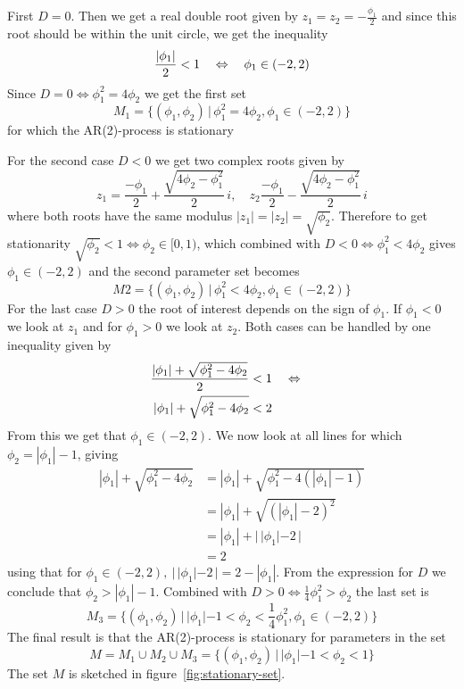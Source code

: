 First $D=0$. Then we get a real double root given by $z_1=z_2=-\frac{\phi_1}{2}$ and since this root should be within the unit circle, we get the inequality
\begin{equation*}
    \frac{|\phi_1|}{2} < 1 \quad\Leftrightarrow\quad \phi_1\in(-2, 2)
\end{equation*}
Since $D=0\Leftrightarrow\phi_1^2=4\phi_2$ we get the first set
\begin{equation*}
    M_1 = \{(\phi_1, \phi_2) \,|\, \phi_1^2=4\phi_2, \phi_1\in(-2,2)\}
\end{equation*}
for which the AR(2)-process is stationary \par
    For the second case $D<0$ we get two complex roots given by
\begin{equation*}
    z_1 = \frac{-\phi_1}{2} + \frac{\sqrt{4\phi_2 - \phi_1^2}}{2}\,i,\quad z_2\frac{-\phi_1}{2} - \frac{\sqrt{4\phi_2 - \phi_1^2}}{2}\,i
\end{equation*}
where both roots have the same modulus $|z_1|=|z_2|=\sqrt{\phi_2}$. Therefore to get stationarity $\sqrt{\phi_2}<1\Leftrightarrow\phi_2\in[0,1)$, which combined with $D<0 \Leftrightarrow \phi_1^2<4\phi_2$ gives $\phi_1\in(-2,2)$ and the second parameter set becomes
\begin{equation*}
    M2 = \{(\phi_1, \phi_2) \,|\, \phi_1^2<4\phi_2, \phi_1\in(-2,2)\}
\end{equation*}
For the last case $D>0$ the root of interest depends on the sign of $\phi_1$. If $\phi_1<0$ we look at $z_1$ and for $\phi_1>0$ we look at $z_2$. Both cases can be handled by one inequality given by
\begin{align*}
    \frac{|\phi_1| + \sqrt{\phi_1^2 - 4\phi_2}}{2} &< 1 \quad\Leftrightarrow\quad\\
    |\phi_1| + \sqrt{\phi_1^2 - 4\phi_2} &< 2
\end{align*}
From this we get that $\phi_1\in(-2,2)$. We now look at all lines for which $\phi_2=|\phi_1|-1$, giving
\begin{align*}
    |\phi_1| + \sqrt{\phi_1^2 - 4\phi_2} &= |\phi_1| + \sqrt{\phi_1^2 - 4(|\phi_1|-1)} \\
    &= |\phi_1| + \sqrt{(|\phi_1|-2)^2} \\
    &= |\phi_1| + |\,|\phi_1|-2\,| \\
    &= 2
\end{align*}
using that for $\phi_1\in(-2,2),\:|\,|\phi_1|-2\,|=2-|\phi_1|$. From the expression for $D$ we conclude that $\phi_2>|\phi_1|-1$. Combined with $D>0\Leftrightarrow \frac{1}{4}\phi_1^2>\phi_2$ the last set is
\begin{equation*}
    M_3 = \{(\phi_1, \phi_2) \,|\, |\phi_1|-1<\phi_2<\frac{1}{4}\phi_1^2, \phi_1\in(-2,2)\}
\end{equation*}
The final result is that the AR(2)-process is stationary for parameters in the set
\begin{equation*}
    M = M_1 \cup M_2 \cup M_3 = \{(\phi_1, \phi_2) \,|\, |\phi_1| - 1 < \phi_2 < 1\}
\end{equation*}
The set $M$ is sketched in figure~\ref{fig:stationary-set}. \par\par

